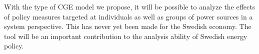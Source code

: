 \documentclass[10pt,a4paper]{article}
\begin{document}
With the type of CGE model we propose, it will be possible to analyze the effects of policy measures targeted at individuals as well as groups of power sources in a system perspective. This has never yet been made for the Swedish economy. The tool will be an important contribution to the analysis ability of Swedish energy policy.

\begin{comment}
Question: Given a ambitious target for the share of renewable energy for Sweden (70 percent), how much nuclear power will fit in the system of electricity production? Answer: The excess electricity will be exported due to the low marginal cost of production of nuclear power. Follow up question: How and how much can we increase the cost of producing nuclear power in order to make it leave the market?
 
A nuclear phase out of Swedish nuclear power will be a process that evolve over time and should be modeled as such in order to capture the adaption of the Swedish economic system over time. Capital adjustment over time in dynamic CGE model bla,bla,bla...
Cost of disposal of nuclear waste

Time to time, requirement of imminent nuclear phase out emerge, most recently in a motion for the Swedish parliament (Motion 2013/14:N430) which states that nuclear power is redundant and that Sweden is equipped with means to supply all electricity demand from renewable sources. An other motion for the Swedish parliament (Motion 2013/14:N334) concludes that the Swedish nuclear power is heavily subsidized and urges substantial increases in both upper limits of liability cost of nuclear accidents (9000 percent increase) and mentions an increase of the cost per kilowatt producing set aside for funding nuclear waste storage at 350 percent.

Motif for renewable energy/electricity:
global warming - fossil fuel dependency (security of supply) - green jobs
In order to limit global warming to two degrees Celsius, reducing the EU's dependence on imports of fossil fuels and stimulate the growth of new green jobs is a sharp increase in the share of renewable energy in Europe absolutely necessary.


The Swedish nuclear power plants are old and according to current law it is possible to replace them.

Cap on hydropower:
feasible sources wind and biofuels

Assumptions on electricity demand

Motion 2013/14:N430
Kärnkraftsavveckling


\end{comment}
\end{document}
